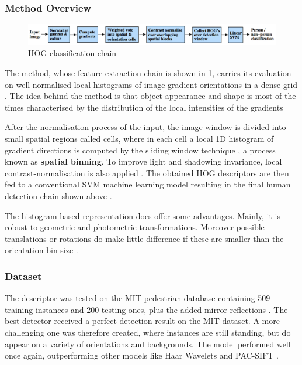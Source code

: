 \subsubsection{Method Overview}

\begin{figure}[!htbp]
\begin{center}
\includegraphics[width=\linewidth]{images/hog_chain.png}
\end{center}
\caption{HOG classification chain \cite{paper:dalal2005histograms}}
\label{fig:hog_chain}
\end{figure}

The method, whose feature extraction chain is shown in \ref{fig:hog_chain}, carries its evaluation on well-normalised local histograms of image gradient orientations in a dense grid \cite{paper:dalal2005histograms}. The idea behind the method is that object appearance and shape is most of the times characterised by the distribution of the local intensities of the gradients \cite{paper:dalal2005histograms}

After the normalisation process of the input, the image window is divided into small spatial regions called cells, where in each cell a local 1D histogram of gradient directions is computed by the sliding window technique \cite{paper:dalal2005histograms}, a process known as \textbf{spatial binning}. To improve light and shadowing invariance, local contrast-normalisation is also applied \cite{paper:dalal2005histograms}. The obtained HOG descriptors are then fed to a conventional SVM machine learning model resulting in the final human detection chain shown above \cite{paper:dalal2005histograms}.

The histogram based representation does offer some advantages. Mainly, it is robust to geometric and photometric transformations. Moreover possible translations or rotations do make little difference if these are smaller than the orientation bin size \cite{paper:dalal2005histograms}.

\subsubsection{Dataset}

The descriptor was tested on the MIT pedestrian database containing 509 training instances and 200 testing ones, plus the added mirror reflections \cite{paper:dalal2005histograms}. The best detector received a perfect detection result on the MIT dataset. A more challenging one was therefore created, where instances are still standing, but do appear on a variety of orientations and backgrounds. The model performed well once again, outperforming other models like Haar Wavelets \cite{oren1997pedestrian} and PAC-SIFT \cite{zhang2012adaptive} \cite{paper:dalal2005histograms}.

